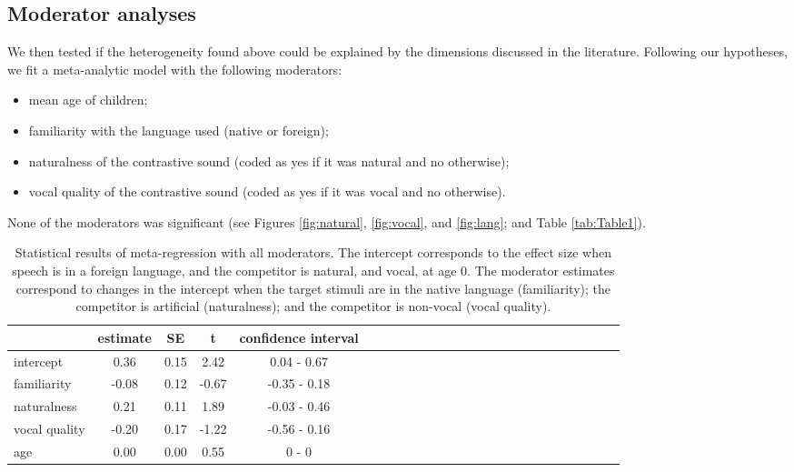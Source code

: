 \documentclass[man]{apa6}
\providecommand{\tightlist}{%
  \setlength{\itemsep}{0pt}\setlength{\parskip}{0pt}}
\begin{document}
\subsection{Moderator analyses}\label{moderator-analyses}

We then tested if the heterogeneity found above could be explained by
the dimensions discussed in the literature. Following our hypotheses, we
fit a meta-analytic model with the following moderators:

\begin{itemize}
\tightlist
\item
  mean age of children;
\item
  familiarity with the language used (native or foreign);
\item
  naturalness of the contrastive sound (coded as yes if it was natural
  and no otherwise);
\item
  vocal quality of the contrastive sound (coded as yes if it was vocal
  and no otherwise).
\end{itemize}

None of the moderators was significant (see Figures \ref{fig:natural},
\ref{fig:vocal}, and \ref{fig:lang}; and Table \ref{tab:Table1}).

\begin{table}[tbp]
\begin{center}
\begin{threeparttable}
\caption{\label{tab:Table2}Statistical results of meta-regression with all moderators. The intercept corresponds to the effect size when speech is in a foreign language, and the competitor is natural, and vocal, at age 0. The moderator estimates correspond to changes in the intercept when the target stimuli are in the native language (familiarity); the competitor is artificial (naturalness); and the competitor is non-vocal (vocal quality).}
\begin{tabular}{lcccclcccclcccclcccclcccc}
\toprule
 & estimate & SE & t & confidence interval\\
\midrule
intercept & 0.36 & 0.15 & 2.42 & 0.04 - 0.67\\
familiarity & -0.08 & 0.12 & -0.67 & -0.35 - 0.18\\
naturalness & 0.21 & 0.11 & 1.89 & -0.03 - 0.46\\
vocal quality & -0.20 & 0.17 & -1.22 & -0.56 - 0.16\\
age & 0.00 & 0.00 & 0.55 & 0 - 0\\
\bottomrule
\end{tabular}
\end{threeparttable}
\end{center}
\end{table}
\end{document}
